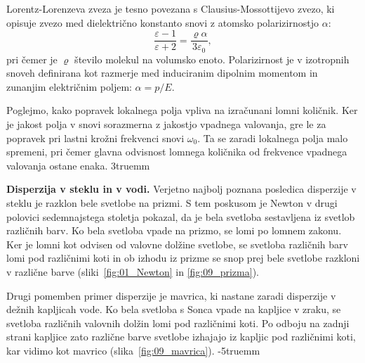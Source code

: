 \begin{remark}
 Lorentz-Lorenzeva zveza je tesno povezana s Clausius-Mossottijevo zvezo, ki opisuje
 zvezo med dielektrično konstanto snovi z atomsko polarizirnostjo $\alpha$:
 \begin{equation}
\frac{\varepsilon -1 }{\varepsilon+2} = \frac{\varrho\alpha}{3 \varepsilon_0},
\label{eq:09_35a}
\end{equation}
pri čemer je $\varrho$ število molekul na volumsko enoto. Polarizirnost je v izotropnih
snoveh definirana kot razmerje med induciranim dipolnim momentom in zunanjim električnim
poljem: $\alpha = p/E$.
\end{remark}

Poglejmo, kako popravek lokalnega polja vpliva na izračunani lomni količnik. Ker je
jakost polja v snovi sorazmerna z jakostjo vpadnega valovanja, gre le za popravek
pri lastni krožni frekvenci snovi $\omega_0$. Ta se zaradi lokalnega polja malo
spremeni, pri čemer glavna odvisnost lomnega količnika od frekvence vpadnega
valovanja ostane enaka.
\vglue3truemm
\begin{example}{\bf Disperzija v steklu in v vodi.}
Verjetno najbolj poznana posledica disperzije v steklu je razklon bele svetlobe
na prizmi. S tem poskusom je Newton v drugi polovici sedemnajstega stoletja
pokazal, da je bela svetloba sestavljena iz svetlob različnih barv. Ko bela
svetloba vpade na prizmo, se lomi po lomnem zakonu. Ker je lomni kot odvisen
od valovne dolžine svetlobe, se svetloba različnih barv lomi pod različnimi
koti in ob izhodu iz prizme se snop prej bele svetlobe razkloni v različne
barve (sliki~\ref{fig:01_Newton} in \ref{fig:09_prizma}).

Drugi pomemben primer disperzije je mavrica, ki nastane zaradi
disperzije v dežnih kapljicah vode. Ko bela svetloba s Sonca vpade
na kapljice v zraku, se svetloba različnih valovnih dolžin 
lomi pod različnimi koti. Po odboju na zadnji strani kapljice 
zato različne barve svetlobe izhajajo iz kapljic pod različnimi koti, 
kar vidimo kot mavrico (slika~\ref{fig:09_mavrica}).
\vglue-5truemm
\end{example}

